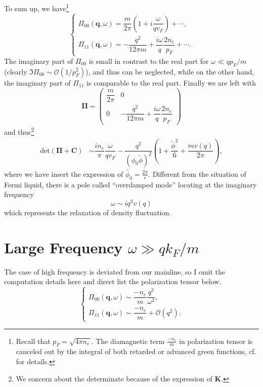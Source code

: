 \documentclass[bachelor,english,numbers]{ustcthesis}
\begin{document}
		\indent To sum up, we have\footnote{Recall that $p_F=\sqrt{4\pi n_e}$. The diamagnetic term $\frac{-n_e}{m}$ in polarization tensor is canceled out by the integral of both retarded or advanced green functions, cf. \cite{altland2010condensed,sadovskii2006diagrammatics} for details.}
		\begin{equation}\label{3.2.13}
			\begin{cases}
				\Pi_{00}(\bm{q},\omega)=\dfrac{m}{2\pi}\left(1+i\dfrac{\omega}{qv_F}\right)+\cdots,\\[1em]
				\Pi_{11}(\bm{q},\omega)=%
				-\dfrac{q^2}{12\pi m}+\dfrac{i\omega}{q}\dfrac{2n_e}{p_F}+\cdots.
			\end{cases}
		\end{equation}
		The imaginary part of $\Pi_{00}$ is small in contrast to the real part for $\omega\ll qp_F/m$ (clearly $\Im \Pi_{00}\sim\mathcal{O}(1/p_F^2)$), and thus can be neglected, while on the other hand, the imaginary part of $\Pi_{11}$ is comparable to the real part. Finally we are left with
		\begin{equation}\label{3.2.14}
			\bm{\Pi}=\left(\begin{array}{cc}
				\dfrac{m}{2\pi} & 0 \\
				0 & -\dfrac{q^2}{12\pi m}+\dfrac{i\omega}{q}\dfrac{2n_e}{p_F}
			\end{array}\right)
		\end{equation}
		and thus\footnote{We concern about the determinate because of the expression of $\bm{K}$.}
		\begin{align*}
			\mathrm{det}(\bm{\Pi}+\bm{C})&\sim\dfrac{in_e}{\pi}\dfrac{\omega}{qv_F}-\dfrac{q^2}{(\phi_0 \widetilde{\phi} )^2}\left(1+\dfrac{\widetilde{\phi}^2 }{6}+\dfrac{mv(q)}{2\pi}\right),
		\end{align*}
		where we have insert the expression of $\widetilde{\phi_0}=\frac{2\pi}{e}$. Different from the situation of Fermi liquid, there is a pole called ``overdamped mode'' locating at the imaginary frequency
		\begin{equation}\label{3.2.15}
			\omega\sim iq^3v(q)
		\end{equation}
		which represents the relaxation of density fluctuation.

	\section{Large Frequency $\omega\gg qk_F/m$}
		\indent\par
		The case of high frequency is deviated from our mainline, so I omit the computation details here and direct list the polarization tensor below.
		\begin{equation}\label{3.2.14}
			\begin{cases}
				\Pi_{00}(\bm{q},\omega)\sim\dfrac{-n_e}{m}\dfrac{q^2}{\omega^2},\\[1em]
				\Pi_{11}(\bm{q},\omega)\sim\dfrac{-n_e}{m}+\mathcal{O}(q^2).
			\end{cases}
		\end{equation}
\end{document}
